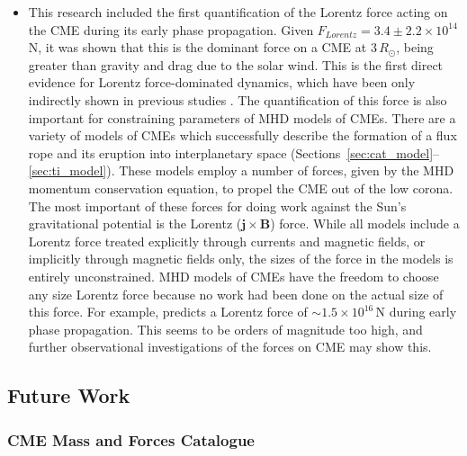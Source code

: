 \begin{itemize}
\item This research included the first quantification of the Lorentz force acting on the CME during its early phase propagation. Given $F_{Lorentz} = 3.4\pm2.2\times10^{14}$\,N, it was shown that this is the dominant force on a CME at $3\,R_{\odot}$, being greater than gravity and drag due to the solar wind. This is the first direct evidence for Lorentz force-dominated dynamics, which have been only indirectly shown in previous studies \citep{bein2011}. The quantification of this force is also important for constraining parameters of MHD models of CMEs. There are a variety of models of CMEs which successfully describe the formation of a flux rope and its eruption into interplanetary space (Sections~\ref{sec:cat_model}--\ref{sec:ti_model}). These models employ a number of forces, given by the MHD momentum conservation equation, to propel the CME out of the low corona. The most important of these forces for doing work against the Sun's gravitational potential is the Lorentz ($\mathbf{j}\times\mathbf{B}$) force. While all models include a Lorentz force treated explicitly through currents and magnetic fields, or implicitly through magnetic fields only, the sizes of the force in the models is entirely unconstrained. MHD models of CMEs have the freedom to choose any size Lorentz force because no work had been done on the actual size of this force. For example, \citet{chen1996} predicts a Lorentz force of $\sim$$1.5\times10^{16}$\,N during early phase propagation. This seems to be orders of magnitude too high, and further observational investigations of the forces on CME may show this.

\end{itemize}

\subsection{Future Work}

\subsubsection{CME Mass and Forces Catalogue}

